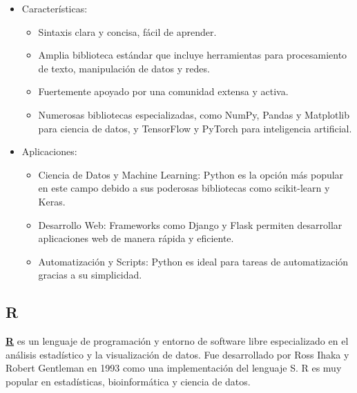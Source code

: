 \documentclass[
  us-letterpaper,
]{scrreprt}
\theoremstyle{plain}
\theoremstyle{plain}
\theoremstyle{definition}
\theoremstyle{remark}
\begin{document}
\begin{itemize}
\item
  Características:

  \begin{itemize}
  \item
    Sintaxis clara y concisa, fácil de aprender.
  \item
    Amplia biblioteca estándar que incluye herramientas para
    procesamiento de texto, manipulación de datos y redes.
  \item
    Fuertemente apoyado por una comunidad extensa y activa.
  \item
    Numerosas bibliotecas especializadas, como NumPy, Pandas y
    Matplotlib para ciencia de datos, y TensorFlow y PyTorch para
    inteligencia artificial.
  \end{itemize}
\item
  Aplicaciones:

  \begin{itemize}
  \item
    Ciencia de Datos y Machine Learning: Python es la opción más popular
    en este campo debido a sus poderosas bibliotecas como scikit-learn y
    Keras.
  \item
    Desarrollo Web: Frameworks como Django y Flask permiten desarrollar
    aplicaciones web de manera rápida y eficiente.
  \item
    Automatización y Scripts: Python es ideal para tareas de
    automatización gracias a su simplicidad.
  \end{itemize}
\end{itemize}

\subsection{R}\label{sec-R}

\href{https://www.r-project.org/}{\textbf{R}} es un lenguaje de
programación y entorno de software libre especializado en el análisis
estadístico y la visualización de datos. Fue desarrollado por Ross Ihaka
y Robert Gentleman en 1993 como una implementación del lenguaje S. R es
muy popular en estadísticas, bioinformática y ciencia de datos.
\end{document}
